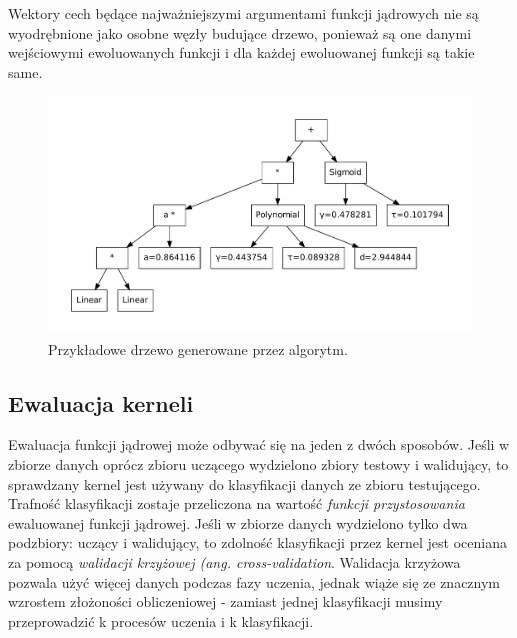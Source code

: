 \documentclass{article}
\begin{document}
Wektory cech będące najważniejszymi argumentami funkcji jądrowych nie są wyodrębnione jako osobne węzły budujące drzewo, ponieważ są one danymi wejściowymi ewoluowanych funkcji i dla każdej ewoluowanej funkcji są takie same.		

\begin{figure}[ht]
\centering
\includegraphics[scale=0.5]{figures/tree}
\caption{Przykładowe drzewo generowane przez algorytm.\label{fig:tree}}
\end{figure}


\subsection{Ewaluacja kerneli}
Ewaluacja funkcji jądrowej może odbywać się na jeden z dwóch sposobów. Jeśli w zbiorze danych oprócz zbioru uczącego wydzielono zbiory testowy i walidujący, to sprawdzany kernel jest używany do klasyfikacji danych ze zbioru testującego. Trafność klasyfikacji zostaje przeliczona na wartość \textit{ funkcji przystosowania} ewaluowanej funkcji jądrowej.
Jeśli w zbiorze danych wydzielono tylko dwa podzbiory: uczący i walidujący, to zdolność klasyfikacji przez kernel jest oceniana za pomocą \textit{walidacji krzyżowej (ang. cross-validation}.
Walidacja krzyżowa pozwala użyć więcej danych podczas fazy uczenia, jednak wiąże się ze znacznym wzrostem złożoności obliczeniowej - zamiast jednej klasyfikacji musimy przeprowadzić k procesów uczenia i k klasyfikacji.
\end{document}
